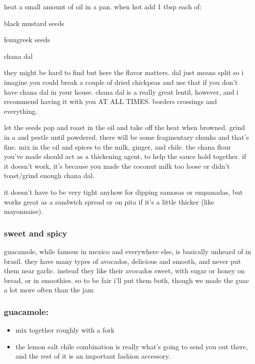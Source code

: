 heat a small amount of oil in a pan. when hot add 1 tbsp each of:

\begin{ingredients}
  \item black mustard seeds
  \item fenugreek seeds
  \item chana dal
\end{ingredients}

they might be hard to find but here the flavor matters. dal just means split 
so i imagine you could break a couple of dried chickpeas and use that if you 
don't have chana dal in your house. chana dal is a really great lentil, 
however, and i recommend having it with you AT ALL TIMES. borders crossings 
and everything.

let the seeds pop and roast in the oil and take off the heat when browned. 
grind in a  and pestle until powdered. there will be some fragmentary 
chunks and that's fine. mix in the oil and spices to the milk, ginger, and 
chile. the chana flour you've made should act as a thickening agent, to help 
the sauce hold together. if it doesn't work, it's because you made the coconut 
milk too loose or didn't toast/grind enough chana dal.

it doesn't have to be very tight anyhow for dipping samosas or empanadas, but 
works great as a sandwich spread or on pita if it's a little thicker (like 
mayonnaise).

\subsubsection{sweet and spicy }

guacamole, while famous in mexico and everywhere else, is basically unheard of 
in brasil. they have many types of avocados, delicious and smooth, and never 
put them near garlic. instead they like their avocados sweet, with sugar or 
honey on bread, or in smoothies. so to be fair i'll put them both, though we 
made the guac a lot more often than the jam

\subsubsection{guacamole:}

\begin{itemize}
  \item mix together roughly with a fork
  \item the lemon salt chile combination is really what's going to send you 
  out there, and the rest of it is an important fashion accessory.
\end{itemize}

